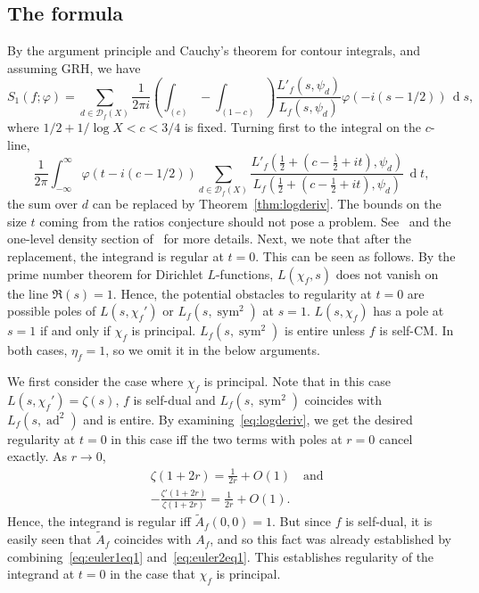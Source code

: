 \documentclass[11pt,reqno]{amsart} \usepackage{fullpage}
\newcommand{\ra}{\rightarrow}
\renewcommand{\d}[1]{\,\operatorname*{d}\!{#1}}
\newcommand\be{\begin{equation}}
\newcommand\ee{\end{equation}}
\newcommand{\Lsym}[2][]{L_f#1\left(#2,\sym^2\right)}
\newcommand{\Lad}[1]{L_f\left(#1,\ad^2\right)}
\newcommand{\Lchi}[2][]{L(#2,\chi_f#1)}
\DeclareMathOperator{\sym}{sym}
\DeclareMathOperator{\ad}{ad}
\newcommand{\D}{\mathcal D_f}
\numberwithin{equation}{section}
\begin{document}
\subsection{The formula}
By the argument principle and Cauchy's theorem for contour integrals, and
assuming GRH, we have
\be S_1(f;\varphi)=\sum_{d\in\D(X)}\frac1{2\pi i}\left(\int_{(c)}-\int_{(1-c)}\right)
\frac{L'_f(s,\psi_d)}{L_f(s,\psi_d)}\varphi(-i(s-1/2)) \d s, \ee
where $1/2+1/\log X<c<3/4$ is fixed. Turning first to the integral on the $c$-line,
\be\label{eq:clineint} \frac1{2\pi}\int_{-\infty}^\infty \varphi(t-i(c-1/2))
\sum_{d\in\D(X)}\frac{L'_f\left(\tfrac12+\left(c-\tfrac12+it\right),\psi_d\right)}
  {L_f\left(\tfrac12+\left(c-\tfrac12+it\right),\psi_d\right)} \d t, \ee
the sum over $d$ can be replaced by Theorem~\ref{thm:logderiv}. The bounds on
the size $t$ coming from the ratios conjecture should not pose a problem.
See~\cite{HKS} and the one-level density section of~\cite{CS} for more details.
Next, we note that after the replacement, the integrand is regular at $t=0$.
This can be seen as follows.
By the prime number theorem for Dirichlet $L$-functions, $L(\chi_f,s)$ does not
vanish on the line $\Re(s)=1$.
Hence, the potential obstacles to regularity at $t=0$ are possible poles of
$\Lchi[']{s}$ or $\Lsym{s}$ at $s=1$. $\Lchi{s}$ has a pole at $s=1$ if and only
if $\chi_f$ is principal. $\Lsym{s}$ is entire unless $f$ is self-CM.
In both cases, $\eta_f=1$, so we omit it in the below arguments.

We first consider the case where $\chi_f$ is principal. Note that in this case
$\Lchi[']{s}=\zeta(s)$, $f$ is self-dual and $\Lsym{s}$ coincides with $\Lad{s}$ and
is entire.
By examining~\eqref{eq:logderiv}, we get the desired regularity at $t=0$ in this
case iff the two terms with poles at $r=0$ cancel exactly. As $r\ra0$,
\begin{align}
  &\zeta(1+2r)=\frac1{2r}+O(1)\quad\text{and} \\
  &-\frac{\zeta'(1+2r)}{\zeta(1+2r)} = \frac1{2r} + O(1).
\end{align}
Hence, the integrand is regular iff $\tilde A_f(0,0)=1$. But since $f$ is self-dual,
it is easily seen that $\tilde A_f$ coincides with $A_f$, and so this fact was
already established by combining~\eqref{eq:euler1eq1} and~\eqref{eq:euler2eq1}.
This establishes regularity of the integrand at $t=0$ in the case that $\chi_f$ is
principal.
\end{document}
